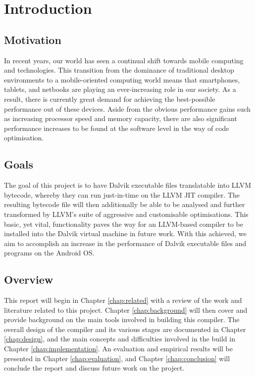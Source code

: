 \chapter{Introduction}

\section{Motivation}

In recent years, our world has seen a continual shift towards mobile computing and technologies. This transition from the dominance of traditional desktop environments to a mobile-oriented computing world means that smartphones, tablets, and netbooks are playing an ever-increasing role in our society. As a result, there is currently great demand for achieving the best-possible performance out of these devices. Aside from the obvious performance gains such as increasing processor speed and memory capacity, there are also significant performance increases to be found at the software level in the way of code optimisation.

\section{Goals}

The goal of this project is to have Dalvik executable files translatable into LLVM bytecode, whereby they can run just-in-time on the LLVM JIT compiler. The resulting bytecode file will then additionally be able to be analysed and further transformed by LLVM's suite of aggressive and customisable optimisations. This basic, yet vital, functionality paves the way for an LLVM-based compiler to be installed into the Dalvik virtual machine in future work. With this achieved, we aim to accomplish an increase in the performance of Dalvik executable files and programs on the Android OS.

\section{Overview}

This report will begin in Chapter \ref{chap:related} with a review of the work and literature related to this project. Chapter \ref{chap:background} will then cover and provide background on the main tools involved in building this compiler. The overall design of the compiler and its various stages are documented in Chapter \ref{chap:design}, and the main concepts and difficulties involved in the build in Chapter \ref{chap:implementation}. An evaluation and empirical results will be presented in Chapter \ref{chap:evaluation}, and Chapter \ref{chap:conclusion} will conclude the report and discuss future work on the project.
